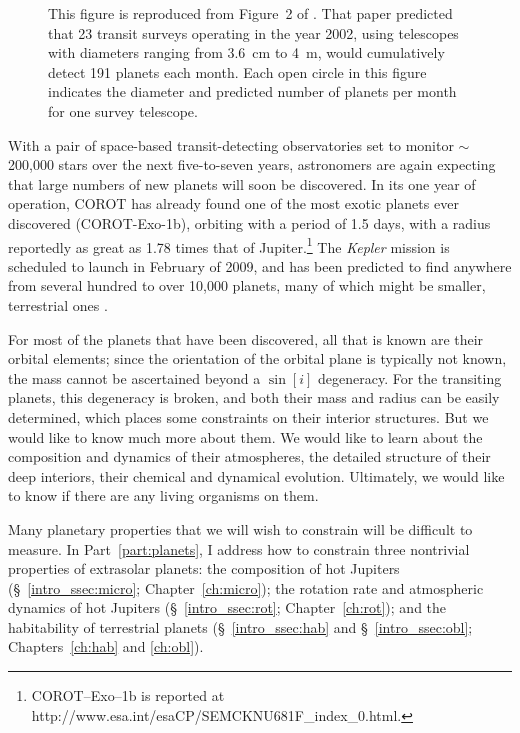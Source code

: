 \begin{figure}[p]
\caption[Predicted number of transits to be seen in 2002 transit
surveys]{This figure is reproduced from Figure~2 of \citet{horne2003}.
That paper predicted that 23 transit surveys operating in the year
2002, using telescopes with diameters ranging from 3.6~cm to 4~m,
would cumulatively detect 191 planets each month.  Each open circle in
this figure indicates the diameter and predicted number of planets per
month for one survey telescope.}
\label{intro_fig:num_transits}
\end{figure}
\afterpage{\clearpage}

With a pair of space-based transit-detecting observatories set to
monitor $\sim$200,000 stars over the next five-to-seven years,
astronomers are again expecting that large numbers of new planets will
soon be discovered.  In its one year of operation, COROT has already
found one of the most exotic planets ever discovered (COROT-Exo-1b),
orbiting with a period of 1.5 days, with a radius reportedly as great
as 1.78 times that of Jupiter.\footnote{COROT--Exo--1b is reported at
http://www.esa.int/esaCP/SEMCKNU681F\_index\_0.html.}  The {\it
Kepler} mission is scheduled to launch in February of 2009, and has
been predicted to find anywhere from several hundred to over 10,000
planets, many of which might be smaller, terrestrial ones
\citep{borucki_et_al2007, borucki_et_al2003, basri_et_al2005}.

For most of the planets that have been discovered, all that is known
are their orbital elements; since the orientation of the orbital plane
is typically not known, the mass cannot be ascertained beyond a
$\sin[i]$ degeneracy.  For the transiting planets, this degeneracy is
broken, and both their mass and radius can be easily determined, which
places some constraints on their interior structures.  But we would
like to know much more about them.  We would like to learn about the
composition and dynamics of their atmospheres, the detailed structure
of their deep interiors, their chemical and dynamical evolution.
Ultimately, we would like to know if there are any living organisms on
them.

Many planetary properties that we will wish to constrain will be
difficult to measure.  In Part~\ref{part:planets}, I address how to
constrain three nontrivial properties of extrasolar planets: 
the composition of hot Jupiters (\S~\ref{intro_ssec:micro};
Chapter~\ref{ch:micro});  the rotation rate and atmospheric
dynamics of hot Jupiters (\S~\ref{intro_ssec:rot};
Chapter~\ref{ch:rot}); and  the habitability of terrestrial
planets (\S~\ref{intro_ssec:hab} and \S~\ref{intro_ssec:obl};
Chapters~\ref{ch:hab} and \ref{ch:obl}).

